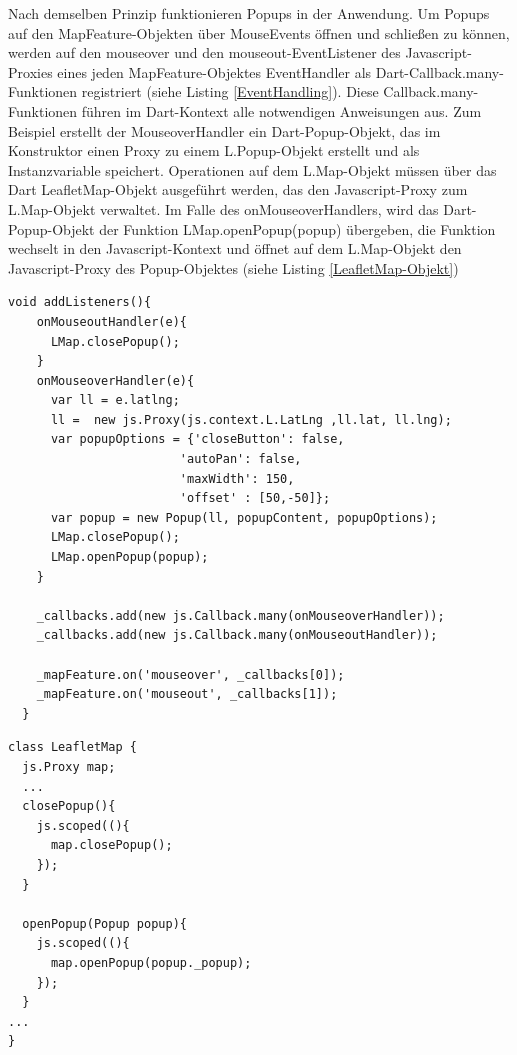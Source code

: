 Nach demselben Prinzip funktionieren Popups in der Anwendung. Um Popups auf den MapFeature-Objekten über MouseEvents öffnen und schließen zu können, werden auf den mouseover und den mouseout-EventListener des Javascript-Proxies eines jeden MapFeature-Objektes EventHandler als Dart-Callback.many-Funktionen registriert (siehe Listing \ref{EventHandling}). Diese Callback.many-Funktionen führen im Dart-Kontext alle notwendigen Anweisungen aus. Zum Beispiel erstellt der MouseoverHandler ein Dart-Popup-Objekt, das im Konstruktor einen Proxy zu einem L.Popup-Objekt erstellt und als Instanzvariable speichert. Operationen auf dem L.Map-Objekt müssen über das Dart LeafletMap-Objekt ausgeführt werden, das den Javascript-Proxy zum L.Map-Objekt verwaltet. Im Falle des onMouseoverHandlers, wird das Dart-Popup-Objekt der Funktion LMap.openPopup(popup) übergeben, die Funktion wechselt in den Javascript-Kontext und öffnet auf dem L.Map-Objekt den Javascript-Proxy des Popup-Objektes (siehe Listing \ref{LeafletMap-Objekt})
\\
\begin{lstlisting}[caption=EventHandling mithilfe von Callback-Funktionen, label= EventHandling]
void addListeners(){
    onMouseoutHandler(e){
      LMap.closePopup();
    }
    onMouseoverHandler(e){
      var ll = e.latlng;
      ll =  new js.Proxy(js.context.L.LatLng ,ll.lat, ll.lng);
      var popupOptions = {'closeButton': false,
                        'autoPan': false,
                        'maxWidth': 150, 
                        'offset' : [50,-50]};
      var popup = new Popup(ll, popupContent, popupOptions);
      LMap.closePopup();
      LMap.openPopup(popup);
    }
    
    _callbacks.add(new js.Callback.many(onMouseoverHandler));
    _callbacks.add(new js.Callback.many(onMouseoutHandler));
    
    _mapFeature.on('mouseover', _callbacks[0]);
    _mapFeature.on('mouseout', _callbacks[1]);
  }
  \end{lstlisting}
  \begin{lstlisting}[caption=Zugriff auf das L.Map-Objekt (im Javascript-Kontext) über das LeafletMap-Objekt (im Dart-Kontext) in LeafletMap.dart, label= LeafletMap-Objekt]
class LeafletMap {
  js.Proxy map;
  ...
  closePopup(){
    js.scoped((){
      map.closePopup();
    });
  }

  openPopup(Popup popup){
    js.scoped((){
      map.openPopup(popup._popup);
    });
  }
...
}  
  \end{lstlisting}